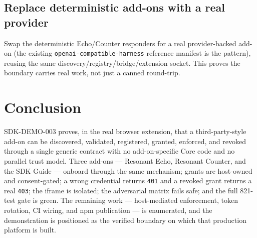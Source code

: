 \documentclass[11pt]{article}
\begin{document}
\subsection{Replace deterministic add-ons with a real provider}

Swap the deterministic Echo/Counter responders for a real provider-backed
add-on (the existing \texttt{openai-compatible-harness} reference manifest is
the pattern), reusing the same discovery/registry/bridge/extension socket. This
proves the boundary carries real work, not just a canned round-trip.

\section{Conclusion}

\textsc{SDK-DEMO-003} proves, in the real browser extension, that a
third-party-style add-on can be discovered, validated, registered, granted,
enforced, and revoked through a single generic contract with no
add-on-specific Core code and no parallel trust model. Three add-ons ---
Resonant Echo, Resonant Counter, and the SDK Guide --- onboard through the same
mechanism; grants are host-owned and consent-gated; a wrong credential returns
\texttt{401} and a revoked grant returns a real \texttt{403}; the iframe is
isolated; the adversarial matrix fails safe; and the full 821-test gate is
green. The remaining work --- host-mediated enforcement, token rotation,
CI wiring, and npm publication --- is enumerated, and the demonstration is
positioned as the verified boundary on which that production platform is built.
\end{document}
